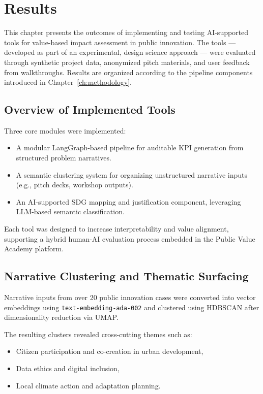 

\chapter{Results}\label{ch:results}

This chapter presents the outcomes of implementing and testing AI-supported tools for value-based impact assessment in public innovation.
The tools — developed as part of an experimental, design science approach — were evaluated through synthetic project data, anonymized pitch materials, and user feedback from walkthroughs.
Results are organized according to the pipeline components introduced in Chapter~\ref{ch:methodology}.

\section{Overview of Implemented Tools}\label{sec:results-overview}

Three core modules were implemented:

\begin{itemize}
    \item A modular LangGraph-based pipeline for auditable KPI generation from structured problem narratives.
    \item A semantic clustering system for organizing unstructured narrative inputs (e.g., pitch decks, workshop outputs).
    \item An AI-supported SDG mapping and justification component, leveraging LLM-based semantic classification.
\end{itemize}

Each tool was designed to increase interpretability and value alignment, supporting a hybrid human-AI evaluation process embedded in the Public Value Academy platform.

\section{Narrative Clustering and Thematic Surfacing}\label{sec:results-clustering}

Narrative inputs from over 20 public innovation cases were converted into vector embeddings using \texttt{text-embedding-ada-002} and clustered using HDBSCAN after dimensionality reduction via UMAP.

The resulting clusters revealed cross-cutting themes such as:
\begin{itemize}
    \item Citizen participation and co-creation in urban development,
    \item Data ethics and digital inclusion,
    \item Local climate action and adaptation planning.
\end{itemize}

